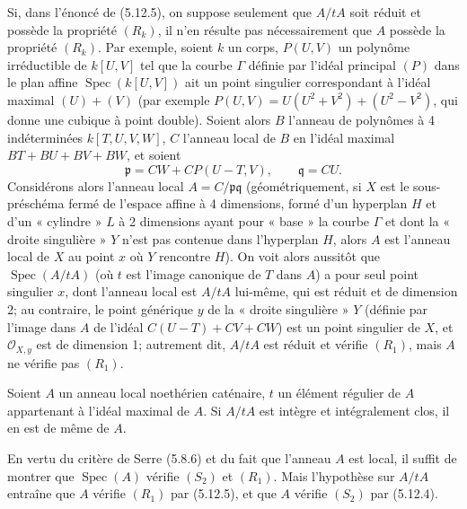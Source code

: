 \begin{remark}[5.12.6]
\label{IV.2.s5.12.6-fr}
Si, dans l'énoncé de (5.12.5), on suppose seulement que $A/tA$ soit réduit et
possède la propriété $(R_k)$, il n'en résulte pas nécessairement que $A$
possède la propriété $(R_k)$. Par exemple, soient $k$ un corps, $P(U,V)$ un
polynôme irréductible de $k[U,V]$ tel que la courbe $\Gamma$ définie par
l'idéal principal $(P)$ dans le plan affine $\operatorname{Spec}(k[U,V])$ ait
un point singulier correspondant à l'idéal maximal $(U)+(V)$ (par exemple
$P(U,V)=U(U^2+V^2)+(U^2-V^2)$, qui donne une cubique à point double). Soient
alors $B$ l'anneau de polynômes à 4 indéterminées $k[T,U,V,W]$, $C$ l'anneau
local de $B$ en l'idéal maximal $BT+BU+BV+BW$, et soient
\[
\mathfrak p=CW+CP(U-T,V),\qquad \mathfrak q=CU.
\]
Considérons alors l'anneau local $A=C/\mathfrak p\mathfrak q$
(géométriquement, si $X$ est le sous-préschéma fermé de l'espace affine à 4
dimensions, formé d'un hyperplan $H$ et d'un « cylindre » $L$ à 2 dimensions
ayant pour « base » la courbe $\Gamma$ et dont la « droite singulière » $Y$
n'est pas contenue dans l'hyperplan $H$, alors $A$ est l'anneau local de $X$ au
point $x$ où $Y$ rencontre $H$). On voit alors aussitôt que
$\operatorname{Spec}(A/tA)$ (où $t$ est l'image canonique de $T$ dans $A$) a
pour seul point singulier $x$, dont l'anneau local est $A/tA$ lui-même, qui est
réduit et de dimension 2; au contraire, le point générique $y$ de la « droite
singulière » $Y$ (définie par l'image dans $A$ de l'idéal
$C(U-T)+CV+CW$) est un point singulier de $X$, et
$\mathcal O_{X,y}$ est de dimension 1; autrement dit, $A/tA$ est réduit et
vérifie $(R_1)$, mais $A$ ne vérifie pas $(R_1)$.
\end{remark}


\begin{corollary}[5.12.7]
\label{IV.2.s5.12.7-fr}
Soient $A$ un anneau local noethérien caténaire, $t$ un élément régulier de
$A$ appartenant à l'idéal maximal de $A$. Si $A/tA$ est intègre et
intégralement clos, il en est de même de $A$.
\end{corollary}

En vertu du critère de Serre (5.8.6) et du fait que l'anneau $A$ est local, il
suffit de montrer que $\operatorname{Spec}(A)$ vérifie $(S_2)$ et $(R_1)$.
Mais l'hypothèse sur $A/tA$ entraîne que $A$ vérifie $(R_1)$ par (5.12.5), et
que $A$ vérifie $(S_2)$ par (5.12.4).

